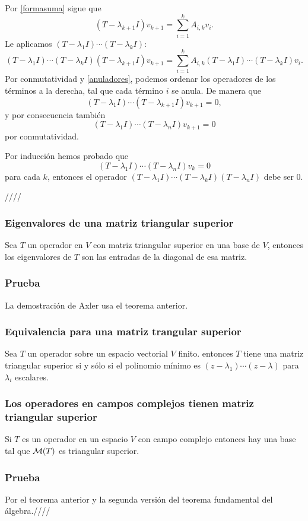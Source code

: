 \documentclass{article}
\begin{document}
Por \ref{formasuma} sigue que
\begin{equation*}
    (T-\lambda_{k+1} I)v_{k+1} = \sum^{k}_{i=1}A_{i,k} v_i.
\end{equation*}
Le aplicamos $(T-\lambda_1 I)\cdots(T-\lambda_k I)$:
$$
(T-\lambda_1 I)\cdots(T-\lambda_k I)
(T-\lambda_{k+1} I)v_{k+1} =
\sum^{k}_{i=1}A_{i,k} (T-\lambda_1 I)\cdots(T-\lambda_k I)v_i.
$$
Por conmutatividad y \ref{anuladores}, podemos ordenar los 
operadores de los términos a la derecha,
tal que cada término $i$ se anula. De manera que
$$(T-\lambda_1 I)\cdots
(T-\lambda_{k+1} I)v_{k+1} = 0,$$
y por consecuencia también
$$(T-\lambda_1 I)\cdots(T-\lambda_{n} I)v_{k+1} = 0$$
por conmutatividad.

Por inducción hemos probado que
$$(T-\lambda_1 I)\cdots(T-\lambda_{n} I)v_k = 0$$
para cada $k$,
entonces el operador $(T-\lambda_1 I)\cdots(T-\lambda_k I)
(T-\lambda_{n} I)$ debe ser $0$.

\hfill ////

\subsubsection{Eigenvalores de una matriz triangular superior}
Sea $T$ un operador en $V$ con matriz triangular superior en
una base de $V$, entonces los eigenvalores de $T$ son
las entradas de la diagonal de esa matriz.
\subsubsection*{Prueba}
La demostración de Axler usa el teorema anterior.

\subsubsection{Equivalencia para una matriz trangular superior}
Sea $T$ un operador sobre un espacio vectorial $V$ finito.
entonces $T$ tiene una matriz triangular superior si y
sólo si el polinomio mínimo es
$(z-\lambda_1)\cdots(z-\lambda)$ para $\lambda_i$ escalares.

\subsubsection{Los operadores en campos complejos tienen matriz triangular superior}
Si $T$ es un operador en un espacio $V$ con campo complejo
entonces hay una base tal que $\mathcal{M}(T)$ es triangular superior.
\subsubsection*{Prueba}
Por el teorema anterior y la segunda versión del teorema
fundamental del álgebra.\hfill ////
\end{document}
